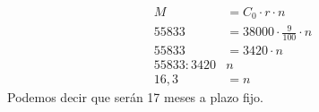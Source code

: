 \documentclass[12pt]{examdesign}
\theoremstyle{plain}
\theoremstyle{definition}
\theoremstyle{remark}
\begin{document}
\begin{shortanswer}[title={Leemos el material de consulta y realizamos las actividades propuestas.}, rearrange=no]
\begin{question}
\begin{answer}
\begin{enumerate}
        			\begin{align*}
        			             M  &=C_{0}\cdot r\cdot n                \\
        			         55833  &=38000\cdot \frac{9}{100}\cdot n\\
        			         55833  &=3420\cdot n\\
        			    55833:3420  & n\\
        			            16,3&=n
        			\end{align*}
        			Podemos decir que serán 17 meses a plazo fijo.
        		\end{enumerate}
        	\end{answer}
        \end{question}
    \end{shortanswer}
\end{document}
